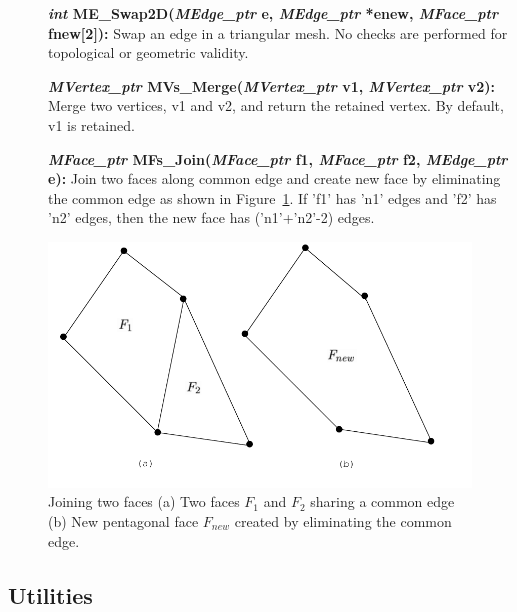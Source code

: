 \documentclass[12pt]{article}
\begin{document}
\begin{description}

\item[]{\bf {\em int} ME\_Swap2D({\em MEdge\_ptr} e,
{\em MEdge\_ptr} *enew, {\em MFace\_ptr} fnew[2]):} Swap an edge
in a triangular mesh. No checks are performed for topological or
geometric validity.

\item[]{\bf {\em MVertex\_ptr} MVs\_Merge({\em MVertex\_ptr} v1, {\em
      MVertex\_ptr} v2):} Merge two vertices, v1 and v2, and return
  the retained vertex. By default, v1 is retained.

\item[]{\bf {\em MFace\_ptr} MFs\_Join({\em MFace\_ptr} f1,
{\em MFace\_ptr} f2, {\em MEdge\_ptr} e):} Join two faces along
common edge and create new face by eliminating the common edge as
shown in Figure~\ref{fig:MFs_Join}. If 'f1' has 'n1' edges and 'f2'
has 'n2' edges, then the new face has ('n1'+'n2'-2) edges.

\end{description}

\begin{figure}[!h]
  \begin{center}
    \includegraphics[scale=1.0]{figures/MFs_Join}
    
    \caption{Joining two faces (a) Two faces $F_1$ and $F_2$ sharing a
      common edge (b) New pentagonal face $F_{new}$ created by
      eliminating the common edge.  }
    \label{fig:MFs_Join}
  \end{center}
\end{figure}

\newpage
\subsection{Utilities}
  
\end{document}
